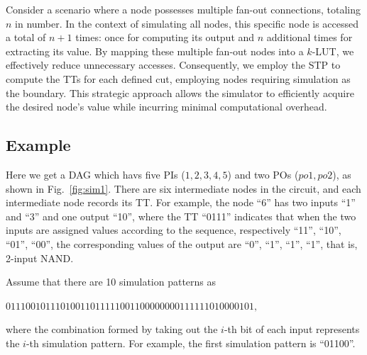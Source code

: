 \documentclass[conference]{IEEEtran}
\begin{document}
Consider a scenario where a node possesses multiple fan-out connections, totaling $n$ in number. 
In the context of simulating all nodes, this specific node is accessed a total of $n+1$ times: once for computing its output and $n$ additional times for extracting its value.
By mapping these multiple fan-out nodes into a $k$-LUT, we effectively reduce unnecessary accesses. 
Consequently, we employ the STP to compute the TTs for each defined cut, employing nodes requiring simulation as the boundary. 
This strategic approach allows the simulator to efficiently acquire the desired node's value while incurring minimal computational overhead.

\subsection{Example}
\label{sec34}
Here we get a DAG which havs five PIs ($1, 2, 3, 4, 5$) and two POs ($po1, po2$), as shown in Fig.~\ref{fig:sim1}.
There are six intermediate nodes in the circuit, and each intermediate node records its TT. 
For example, the node ``6'' has two inputs ``1'' and ``3'' and one output ``10'', where the TT ``0111'' indicates that when the two inputs are assigned values according to the sequence, respectively ``11'', ``10'', ``01'', ``00'', the corresponding values of the output are ``0'', ``1'', ``1'', ``1'', that is, 2-input NAND.

Assume that there are 10 simulation patterns as
\begin{center}
$01110010111010011011111001100000000111111010000101,$
\end{center}
where the combination formed by taking out the $i$-th bit of each input represents the $i$-th simulation pattern.
For example, the first simulation pattern is ``01100''.
\end{document}
